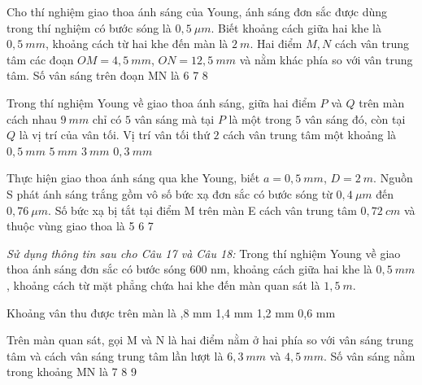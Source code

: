 \begin{ex}
Cho thí nghiệm giao thoa ánh sáng của Young, ánh sáng đơn sắc được dùng trong thí nghiệm có bước sóng là $0,5\  \mu m$. Biết khoảng cách giữa hai khe là $0,5\ mm$, khoảng cách từ hai khe đến màn là $2\ m$. Hai điểm $M, N$ cách vân trung tâm các đoạn $OM = 4,5\ mm$, $ON = 12,5\ mm$ và nằm khác phía so với vân trung tâm. Số vân sáng trên đoạn MN là
\choice
{6}
{7}
{8}
{}
\end{ex}
\begin{ex}
Trong thí nghiệm Young về giao thoa ánh sáng, giữa hai điểm $P$ và $Q$ trên màn cách nhau $9\ mm$ chỉ có $5$ vân sáng mà tại $P$ là một trong $5$ vân sáng đó, còn tại $Q$ là vị trí của vân tối. Vị trí vân tối thứ $2$ cách vân trung tâm một khoảng là
\choice
{$0,5\ mm$}
{$5\ mm$}
{\True $3\ mm$}
{$0,3\ mm$}
\loigiai{}
\end{ex}
\begin{ex}
Thực hiện giao thoa ánh sáng qua khe Young, biết $a = 0,5\ mm$, $D = 2\ m$. Nguồn S phát ánh sáng trắng gồm vô số bức xạ đơn sắc có bước sóng từ $0,4\ \mu m$ đến $0,76\ \mu m$. Số bức xạ bị tắt tại điểm M trên màn E cách vân trung tâm $0,72\  cm$ và thuộc vùng giao thoa là
\choice
{}
{5}
{6}
{7}
\end{ex}
\textit{Sử dụng thông tin sau cho Câu 17 và Câu 18:} Trong thí nghiệm Young về giao thoa ánh sáng đơn sắc có bước sóng 600 nm, khoảng cách giữa hai khe là $0,5\ mm$, khoảng cách từ mặt phẳng chứa hai khe đến màn quan sát là $1,5\ m$.
\begin{ex}
Khoảng vân thu được trên màn là 
\choice
{,8 mm}
{1,4 mm}
{1,2 mm}
{0,6 mm}
\loigiai{  }
\end{ex}
\begin{ex}
Trên màn quan sát, gọi M và N là hai điểm nằm ở hai phía so với vân sáng trung tâm và cách vân sáng trung tâm lần lượt là $6,3\ mm$ và $4,5\ mm$. Số vân sáng nằm trong khoảng MN là
\choice
{}
{7}
{8}
{9}
\loigiai{  }
\end{ex}


























